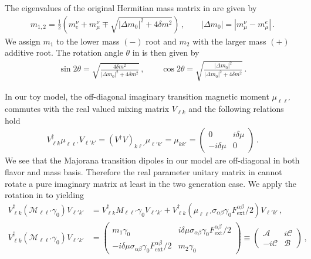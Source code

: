 The eigenvalues of the original Hermitian mass matrix in  are given by
\begin{align}
\label{massroot:1}
m_{1,2}=\frac{1}{2}\left(m_{e}^{\nu}+m_{\mu}^{\nu}\mp\sqrt{|\Delta m_{0}|^{2}+4\delta m^{2}}\right)\,,\qquad
|\Delta m_{0}|=|m_{\mu}^{\nu}-m_{\mu}^{e}|\,.
\end{align}
We assign $m_{1}$ to the lower mass $(-)$ root and $m_{2}$ with the larger mass $(+)$ additive root. The rotation angle $\theta$ in  is then given by
\begin{align}
\label{massroot:2}
\sin2\theta=\sqrt{\frac{4\delta m^{2}}{|\Delta m_{0}|^{2}+4\delta m^{2}}}\,,\qquad
\cos2\theta=\sqrt{\frac{|\Delta m_{0}|^{2}}{|\Delta m_{0}|^{2}+4\delta m^{2}}}\,.
\end{align}

In our toy model, the off-diagonal imaginary transition magnetic moment  $\mu_{\ell\ell'}$ commutes with the real valued mixing matrix $V_{\ell k}$ and the following relations hold
\begin{align}
\label{commuting:1}
V_{\ell k}^{\dag}\mu_{\ell\ell'}V_{\ell' k'}=(V^{\dag}V)_{k\ell'}\mu_{\ell'k'}=\mu_{kk'}=
\begin{pmatrix}
0 & i\delta\mu\\
-i\delta\mu & 0
\end{pmatrix}\,.
\end{align}
We see that the Majorana transition dipoles in our model are off-diagonal in both flavor and mass basis. Therefore the real parameter unitary matrix in  cannot rotate a pure imaginary matrix at least in the two generation case. We apply the rotation in  to  yielding
\begin{align}
\label{herm:2}
V_{\ell k}^{\dag}(\mathcal{M}_{\ell\ell'}\gamma_{0})V_{\ell' k'} &= 
V_{\ell k}^{\dag}M_{\ell\ell'}\gamma_{0}V_{\ell' k'} +
V_{\ell k}^{\dag}(\mu_{\ell\ell'}\sigma_{\alpha\beta}\gamma_{0}F^{\alpha\beta}_\mathrm{ext}/2)V_{\ell' k'}\,,\\
\label{herm:3}
V_{\ell k}^{\dag}(\mathcal{M}_{\ell\ell'}\gamma_{0})V_{\ell' k'} &= 
\begin{pmatrix}
m_{1}\gamma_{0} & i\delta\mu\sigma_{\alpha\beta}\gamma_{0}F^{\alpha\beta}_\mathrm{ext}/2\\
-i\delta\mu\sigma_{\alpha\beta}\gamma_{0}F^{\alpha\beta}_\mathrm{ext}/2 & m_{2}\gamma_{0}
\end{pmatrix}\equiv
\begin{pmatrix}
\mathcal{A} & i\mathcal{C}\\
-i\mathcal{C} & \mathcal{B}
\end{pmatrix}\,,
\end{align}
